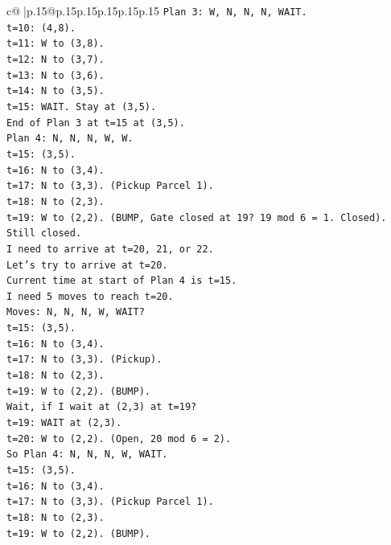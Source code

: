 \documentclass{article}
\begin{document}
{\begin{supertabular}{c@{$\;$}|p{.15\linewidth}@{}p{.15\linewidth}p{.15\linewidth}p{.15\linewidth}p{.15\linewidth}p{.15\linewidth}}
{{{\texttt{Plan 3: W, N, N, N, WAIT.} \\
\texttt{t=10: (4,8).} \\
\texttt{t=11: W to (3,8).} \\
\texttt{t=12: N to (3,7).} \\
\texttt{t=13: N to (3,6).} \\
\texttt{t=14: N to (3,5).} \\
\texttt{t=15: WAIT. Stay at (3,5).} \\
\texttt{End of Plan 3 at t=15 at (3,5).} \\
\texttt{Plan 4: N, N, N, W, W.} \\
\texttt{t=15: (3,5).} \\
\texttt{t=16: N to (3,4).} \\
\texttt{t=17: N to (3,3). (Pickup Parcel 1).} \\
\texttt{t=18: N to (2,3).} \\
\texttt{t=19: W to (2,2). (BUMP, Gate closed at 19? 19 mod 6 = 1. Closed).} \\
\texttt{Still closed.} \\
\texttt{I need to arrive at t=20, 21, or 22.} \\
\texttt{Let's try to arrive at t=20.} \\
\texttt{Current time at start of Plan 4 is t=15.} \\
\texttt{I need 5 moves to reach t=20.} \\
\texttt{Moves: N, N, N, W, WAIT?} \\
\texttt{t=15: (3,5).} \\
\texttt{t=16: N to (3,4).} \\
\texttt{t=17: N to (3,3). (Pickup).} \\
\texttt{t=18: N to (2,3).} \\
\texttt{t=19: W to (2,2). (BUMP).} \\
\texttt{Wait, if I wait at (2,3) at t=19?} \\
\texttt{t=19: WAIT at (2,3).} \\
\texttt{t=20: W to (2,2). (Open, 20 mod 6 = 2).} \\
\texttt{So Plan 4: N, N, N, W, WAIT.} \\
\texttt{t=15: (3,5).} \\
\texttt{t=16: N to (3,4).} \\
\texttt{t=17: N to (3,3). (Pickup Parcel 1).} \\
\texttt{t=18: N to (2,3).} \\
\texttt{t=19: W to (2,2). (BUMP).} \\
}}}
\end{supertabular}}
\end{document}
